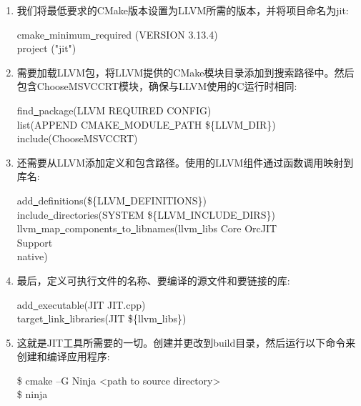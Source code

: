 \begin{enumerate}
\item 我们将最低要求的CMake版本设置为LLVM所需的版本，并将项目命名为jit:
\begin{tcolorbox}[colback=white,colframe=black]
cmake\underline{~}minimum\underline{~}required (VERSION 3.13.4) \\
project ("jit")
\end{tcolorbox}

\item 需要加载LLVM包，将LLVM提供的CMake模块目录添加到搜索路径中。然后包含ChooseMSVCCRT模块，确保与LLVM使用的C运行时相同:
\begin{tcolorbox}[colback=white,colframe=black]
find\underline{~}package(LLVM REQUIRED CONFIG) \\
list(APPEND CMAKE\underline{~}MODULE\underline{~}PATH \$\{LLVM\underline{~}DIR\}) \\
include(ChooseMSVCCRT)
\end{tcolorbox}

\item 还需要从LLVM添加定义和包含路径。使用的LLVM组件通过函数调用映射到库名:
\begin{tcolorbox}[colback=white,colframe=black]
add\underline{~}definitions(\$\{LLVM\underline{~}DEFINITIONS\}) \\
include\underline{~}directories(SYSTEM \$\{LLVM\underline{~}INCLUDE\underline{~}DIRS\}) \\
llvm\underline{~}map\underline{~}components\underline{~}to\underline{~}libnames(llvm\underline{~}libs Core OrcJIT \\
\hspace*{6cm}Support  \\
\hspace*{6cm}native)
\end{tcolorbox}

\item 最后，定义可执行文件的名称、要编译的源文件和要链接的库:
\begin{tcolorbox}[colback=white,colframe=black]
add\underline{~}executable(JIT JIT.cpp) \\
target\underline{~}link\underline{~}libraries(JIT \$\{llvm\underline{~}libs\})
\end{tcolorbox}

\item 这就是JIT工具所需要的一切。创建并更改到build目录，然后运行以下命令来创建和编译应用程序:
\begin{tcolorbox}[colback=white,colframe=black]
\$ cmake –G Ninja <path to source directory> \\
\$ ninja
\end{tcolorbox}

\end{enumerate}

